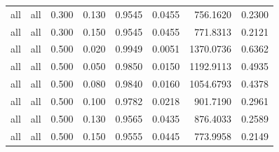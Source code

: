 \begin{table}[t]
\begin{tabular}{lrrrrrrr}
all & all & 0.300 & 0.130 & 0.9545 & 0.0455 & 756.1620 & 0.2300 \\
all & all & 0.300 & 0.150 & 0.9545 & 0.0455 & 771.8313 & 0.2121 \\
all & all & 0.500 & 0.020 & 0.9949 & 0.0051 & 1370.0736 & 0.6362 \\
all & all & 0.500 & 0.050 & 0.9850 & 0.0150 & 1192.9113 & 0.4935 \\
all & all & 0.500 & 0.080 & 0.9840 & 0.0160 & 1054.6793 & 0.4378 \\
all & all & 0.500 & 0.100 & 0.9782 & 0.0218 & 901.7190 & 0.2961 \\
all & all & 0.500 & 0.130 & 0.9565 & 0.0435 & 876.4033 & 0.2589 \\
all & all & 0.500 & 0.150 & 0.9555 & 0.0445 & 773.9958 & 0.2149 \\
\hline
\end{tabular}
\end{table}
